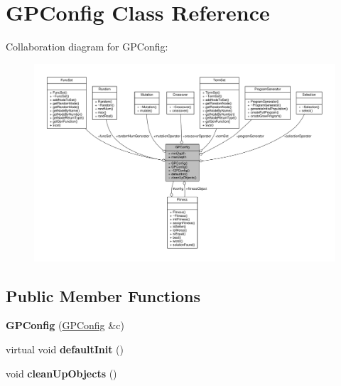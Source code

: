 \hypertarget{classGPConfig}{}\section{G\+P\+Config Class Reference}
\label{classGPConfig}


Collaboration diagram for G\+P\+Config\+:
\nopagebreak
\begin{figure}[H]
\begin{center}
\leavevmode
\includegraphics[width=350pt]{classGPConfig__coll__graph}
\end{center}
\end{figure}
\subsection*{Public Member Functions}
\begin{DoxyCompactItemize}
\item 
\hypertarget{classGPConfig_aab0af46c7d372c9a2f0586f02626c41d}{}\label{classGPConfig_aab0af46c7d372c9a2f0586f02626c41d} 
{\bfseries G\+P\+Config} (\hyperlink{classGPConfig}{G\+P\+Config} \&c)
\item 
\hypertarget{classGPConfig_a58149f4ce73c4551fabe5958b75aadee}{}\label{classGPConfig_a58149f4ce73c4551fabe5958b75aadee} 
virtual void {\bfseries default\+Init} ()
\item 
\hypertarget{classGPConfig_ac3031839d0721927269b57948d60c7b6}{}\label{classGPConfig_ac3031839d0721927269b57948d60c7b6} 
void {\bfseries clean\+Up\+Objects} ()
\end{DoxyCompactItemize}
